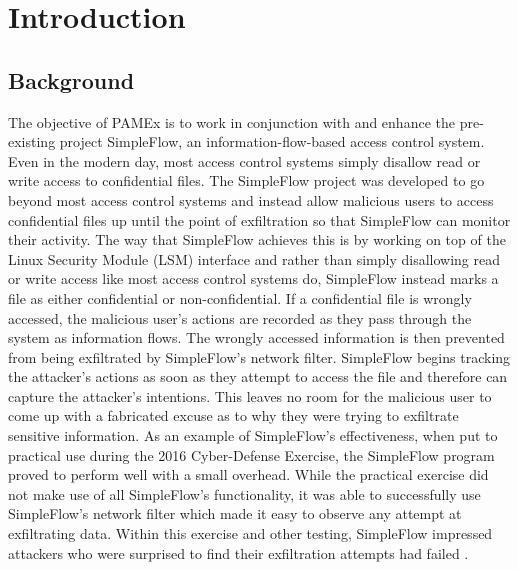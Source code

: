 \section{Introduction}

\label{sec:Introduction}
\vspace{\baselineskip}

\subsection{Background}
\par 
\vspace{\baselineskip}
\hspace{1em}
The objective of PAMEx is to work in conjunction with and enhance the 
pre-existing project SimpleFlow, an information-flow-based access 
control system. Even in the modern day, most access control systems 
simply disallow read or write access to confidential files. The 
SimpleFlow project was developed to go beyond most access control 
systems and instead allow malicious users to access confidential 
files up until the point of exfiltration so that SimpleFlow can monitor their activity. The way that 
SimpleFlow achieves this is by working on top of the Linux Security 
Module (LSM) interface and rather than simply disallowing read or write 
access like most access control systems do, SimpleFlow instead marks a 
file as either confidential or non-confidential. If a confidential 
file is wrongly accessed, the malicious user’s actions are recorded as they pass 
through the system as information flows. The wrongly accessed 
information is then prevented from being exfiltrated by SimpleFlow's network filter. 
SimpleFlow begins tracking the attacker’s actions as soon as they 
attempt to access the file and therefore can capture the attacker’s 
intentions. This leaves no room for the malicious user to come up with 
a fabricated excuse as to why they were trying to exfiltrate sensitive 
information. As an example of SimpleFlow’s effectiveness, when put to 
practical use during the 2016 Cyber-Defense Exercise, the SimpleFlow 
program proved to perform well with a small overhead. While the 
practical exercise did not make use of all SimpleFlow’s functionality, 
it was able to successfully use SimpleFlow’s network filter which made 
it easy to observe any attempt at exfiltrating data. Within this 
exercise and other testing, SimpleFlow impressed attackers who were 
surprised to find their exfiltration attempts had failed \cite{ryan2016}. 

